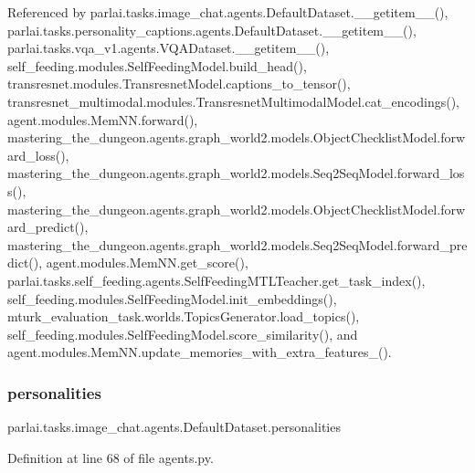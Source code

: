 Referenced by parlai.\+tasks.\+image\+\_\+chat.\+agents.\+Default\+Dataset.\+\_\+\+\_\+getitem\+\_\+\+\_\+(), parlai.\+tasks.\+personality\+\_\+captions.\+agents.\+Default\+Dataset.\+\_\+\+\_\+getitem\+\_\+\+\_\+(), parlai.\+tasks.\+vqa\+\_\+v1.\+agents.\+V\+Q\+A\+Dataset.\+\_\+\+\_\+getitem\+\_\+\+\_\+(), self\+\_\+feeding.\+modules.\+Self\+Feeding\+Model.\+build\+\_\+head(), transresnet.\+modules.\+Transresnet\+Model.\+captions\+\_\+to\+\_\+tensor(), transresnet\+\_\+multimodal.\+modules.\+Transresnet\+Multimodal\+Model.\+cat\+\_\+encodings(), agent.\+modules.\+Mem\+N\+N.\+forward(), mastering\+\_\+the\+\_\+dungeon.\+agents.\+graph\+\_\+world2.\+models.\+Object\+Checklist\+Model.\+forward\+\_\+loss(), mastering\+\_\+the\+\_\+dungeon.\+agents.\+graph\+\_\+world2.\+models.\+Seq2\+Seq\+Model.\+forward\+\_\+loss(), mastering\+\_\+the\+\_\+dungeon.\+agents.\+graph\+\_\+world2.\+models.\+Object\+Checklist\+Model.\+forward\+\_\+predict(), mastering\+\_\+the\+\_\+dungeon.\+agents.\+graph\+\_\+world2.\+models.\+Seq2\+Seq\+Model.\+forward\+\_\+predict(), agent.\+modules.\+Mem\+N\+N.\+get\+\_\+score(), parlai.\+tasks.\+self\+\_\+feeding.\+agents.\+Self\+Feeding\+M\+T\+L\+Teacher.\+get\+\_\+task\+\_\+index(), self\+\_\+feeding.\+modules.\+Self\+Feeding\+Model.\+init\+\_\+embeddings(), mturk\+\_\+evaluation\+\_\+task.\+worlds.\+Topics\+Generator.\+load\+\_\+topics(), self\+\_\+feeding.\+modules.\+Self\+Feeding\+Model.\+score\+\_\+similarity(), and agent.\+modules.\+Mem\+N\+N.\+update\+\_\+memories\+\_\+with\+\_\+extra\+\_\+features\+\_\+().

\mbox{\label{classparlai_1_1tasks_1_1image__chat_1_1agents_1_1DefaultDataset_a823a0d9ee64ca85730374c1a944ed789}} 
\subsubsection{\texorpdfstring{personalities}{personalities}}
{\footnotesize\ttfamily parlai.\+tasks.\+image\+\_\+chat.\+agents.\+Default\+Dataset.\+personalities}



Definition at line 68 of file agents.\+py.



